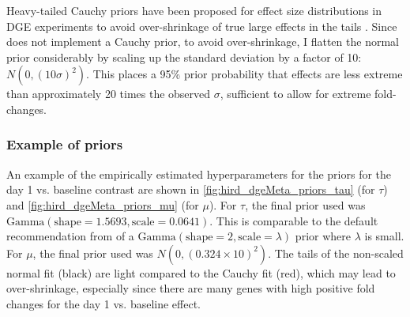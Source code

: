 Heavy-tailed Cauchy priors have been proposed for effect size distributions in \gls{DGE} experiments to avoid over-shrinkage of true large effects in the tails \autocite{zhu2019HeavytailedPriorDistributions}.
Since  does not implement a Cauchy prior, to avoid over-shrinkage, I flatten the normal prior considerably by scaling up the standard deviation by a factor of 10: $N(0, (10\sigma)^2)$.
This places a 95\% prior probability that effects are less extreme than approximately 20 times the observed $\sigma$, sufficient to allow for extreme fold-changes.

\subsubsection{Example of priors}

An example of the empirically estimated hyperparameters for the priors for the day 1 vs. baseline contrast are shown in \cref{fig:hird_dgeMeta_priors_tau} (for $\tau$) and \cref{fig:hird_dgeMeta_priors_mu} (for $\mu$).
For $\tau$, the final prior used was $\text{Gamma}(\text{shape}=\num{1.5693}, \text{scale}=\num{0.0641})$.
This is comparable to the default recommendation from \textcite{chung2013NondegeneratePenalizedLikelihood} of a $\text{Gamma}(\text{shape}=2, \text{scale}=\lambda)$ prior where $\lambda$ is small.
For $\mu$, the final prior used was $N(0, (0.324 \times 10)^2)$.
The tails of the non-scaled normal fit (black) are light compared to the Cauchy fit (red), which may lead to over-shrinkage, especially since there are many genes with high positive fold changes for the day 1 vs. baseline effect.

